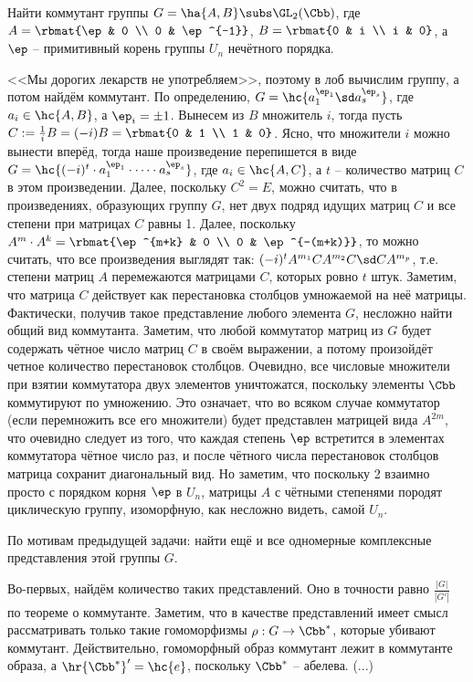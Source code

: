 \documentclass[a4paper]{article}
\begin{document}
\begin{problem}
Найти коммутант группы $G=\ha{A, B} \subs \GL_2(\Cbb)$, где
$A=\rbmat{\ep & 0 \\ 0 & \ep^{-1}}$, $B=\rbmat{0 & i \\ i & 0}$, а $\ep$ -- примитивный корень группы
$U_n$ нечётного порядка.
\end{problem}
\begin{solution}
<<Мы дорогих лекарств не употребляем>>, поэтому в лоб вычислим группу, а потом найдём коммутант.  По
определению, $G = \hc{a_1^{\ep_1}\sd a_s^{\ep_s}}$, где $a_i \in \hc{A, B}$, а $\ep_i = \pm 1$. Вынесем
из $B$ множитель $i$, тогда пусть $C := \frac{1}{i}B=(-i)B=\rbmat{0 & 1 \\ 1 & 0}$. Ясно, что множители $i$
можно вынести вперёд, тогда наше произведение перепишется в виде $G = \hc{(-i)^t \cdot
a_1^{\ep_1}\cdot\dots\cdot a_s^{\ep_s}}$, где $a_i \in \hc{A, C}$, а $t$ -- количество матриц $C$ в этом
произведении. Далее, поскольку $C^2=E$, можно считать, что в произведениях, образующих группу $G$, нет двух
подряд идущих матриц $C$ и все степени при матрицах $C$ равны 1. Далее, поскольку $A^m \cdot A^k=
\rbmat{\ep^{m+k} & 0 \\ 0 & \ep^{-(m+k)}}$, то можно считать, что все произведения выглядят так:
$(-i)^tA^{m_1}CA^{m_2}C\sd CA^{m_p}$, т.е. степени матриц $A$ перемежаются матрицами $C$, которых ровно
$t$ штук. Заметим, что матрица $C$ действует как перестановка столбцов умножаемой на неё матрицы. Фактически,
получив такое представление любого элемента $G$, несложно найти общий вид коммутанта. Заметим, что любой
коммутатор матриц из $G$ будет содержать чётное число матриц $C$ в своём выражении, а потому произойдёт
четное количество перестановок столбцов. Очевидно, все числовые множители при взятии коммутатора двух
элементов уничтожатся, поскольку элементы $\Cbb$ коммутируют по умножению. Это означает, что во всяком
случае коммутатор (если перемножить все его множители) будет представлен матрицей вида $A^{2m}$, что очевидно
следует из того, что каждая степень $\ep$ встретится в элементах коммутатора чётное число раз, и после
чётного числа перестановок столбцов матрица сохранит диагональный вид. Но заметим, что поскольку 2 взаимно
просто с порядком корня $\ep$ в $U_n$, матрицы $A$ с чётными степенями породят циклическую группу,
изоморфную, как несложно видеть, самой $U_n$.
\end{solution}

\begin{problem}
По мотивам предыдущей задачи: найти ещё и все одномерные комплексные представления этой группы $G$.
\end{problem}
\begin{solution}
Во-первых, найдём количество таких представлений. Оно в точности равно $\frac{|G|}{|G'|}$ по теореме  о
коммутанте. Заметим, что в качестве представлений имеет смысл рассматривать только такие гомоморфизмы $\rho:
G \to \Cbb^*$, которые убивают коммутант. Действительно, гомоморфный образ коммутант лежит в коммутанте образа,
а $\hr{\Cbb^*}'=\hc{e}$, поскольку $\Cbb^*$ -- абелева. (...)
\end{solution}
\end{document}
